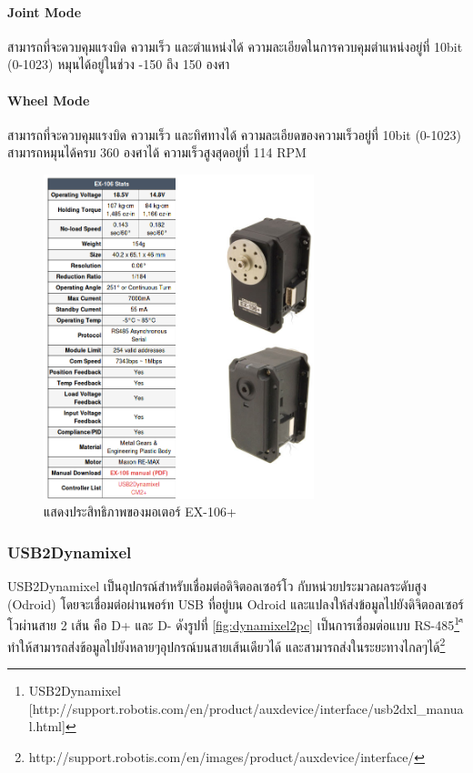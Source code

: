 \paragraph*{Joint Mode}
สามารถที่จะควบคุมแรงบิด ความเร็ว และตำแหน่งได้ ความละเอียดในการควบคุมตำแหน่งอยู่ที่ 10bit (0-1023) หมุนได้อยู่ในช่วง -150 ถึง 150 องศา

\paragraph*{Wheel Mode}
สามารถที่จะควบคุมแรงบิด ความเร็ว และทิศทางได้ ความละเอียดของความเร็วอยู่ที่ 10bit (0-1023) สามารถหมุนได้ครบ 360 องศาได้ ความเร็วสูงสุดอยู่ที่ 114 RPM

\begin{figure}[!ht]
    \centering
    \includegraphics[width=0.7\textwidth]{chapter3/images/dxl_ex106.png}
    \caption{แสดงประสิทธิภาพของมอเตอร์ EX-106+}
    \label{fig:dxl_ex106}
\end{figure}


\clearpage
\subsubsection*{USB2Dynamixel}
USB2Dynamixel เป็นอุปกรณ์สำหรับเชื่อมต่อดิจิตอลเซอร์โว กับหน่วยประมวลผลระดับสูง (Odroid) โดยจะเชื่อมต่อผ่านพอร์ท USB
ที่อยู่บน Odroid และแปลงให้ส่งข้อมูลไปยังดิจิตอลเซอร์โวผ่านสาย 2 เส้น คือ D+ และ D- ดังรูปที่ \ref{fig:dynamixel2pc}
เป็นการเชื่อมต่อแบบ RS-485\footnote{USB2Dynamixel [http://support.robotis.com/en/product/auxdevice/interface/usb2dxl\_manual.html]}
ืทำให้สามารถส่งข้อมูลไปยังหลายๆอุปกรณ์บนสายเส้นเดียวได้
และสามารถส่งในระยะทางไกลๆได้\footnote{http://support.robotis.com/en/images/product/auxdevice/interface/}



